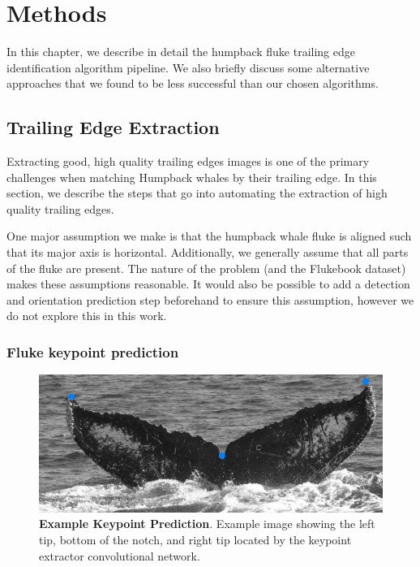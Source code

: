   
\chapter{Methods} \label{sec:methods}

In this chapter, we describe in detail the humpback fluke trailing edge identification algorithm pipeline.
We also briefly discuss some alternative approaches that we found to be less successful than our chosen algorithms.

\section{Trailing Edge Extraction}

Extracting good, high quality trailing edges images is one of the primary challenges when matching Humpback whales by their trailing edge.
In this section, we describe the steps that go into automating the extraction of high quality trailing edges.

One major assumption we make is that the humpback whale fluke is aligned such that its major axis is horizontal.
Additionally, we generally assume that all parts of the fluke are present.
The nature of the problem (and the Flukebook dataset) makes these assumptions reasonable.
It would also be possible to add a detection and orientation prediction step beforehand to ensure this assumption, however we do not explore this in this work.

\subsection{Fluke keypoint prediction}


\begin{figure}[t]%
\centering
\includegraphics[width=1.0\textwidth]{../images/aid88_kpoverlay.png}
\caption{\textbf{Example Keypoint Prediction}. Example image showing the left tip, bottom of the notch, and right tip located by the keypoint extractor convolutional network.}
\label{fig:example_kp}
\end{figure}

